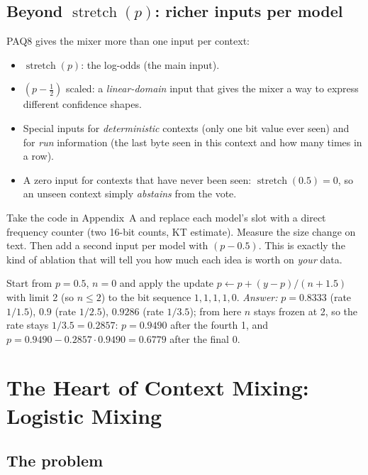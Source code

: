 \documentclass[11pt,a4paper,openany]{book}
\newcommand{\st}{\operatorname{stretch}}
\theoremstyle{definition}
\theoremstyle{remark}
\begin{document}
\section{Beyond $\st(p)$: richer inputs per model}

PAQ8 gives the mixer more than one input per context:
\begin{itemize}
\item $\st(p)$: the log-odds (the main input).
\item $(p-\tfrac12)$ scaled: a \emph{linear-domain} input that gives the mixer a way to express different confidence shapes.
\item Special inputs for \emph{deterministic} contexts (only one bit value ever seen) and for \emph{run} information (the last byte seen in this context and how many times in a row).
\item A zero input for contexts that have never been seen: $\st(0.5)=0$, so an unseen context simply \emph{abstains} from the vote.
\end{itemize}

\begin{handson}
Take the code in Appendix~A and replace each model's slot with a direct frequency counter (two 16-bit counts, KT estimate). Measure the size change on text. Then add a second input per model with $(p-0.5)$. This is exactly the kind of ablation that will tell you how much each idea is worth on \emph{your} data.
\end{handson}

\begin{exercise}
Start from $p=0.5$, $n=0$ and apply the update $p\leftarrow p+(y-p)/(n+1.5)$ with limit 2 (so $n\le2$) to the bit sequence $1,1,1,1,0$. \emph{Answer:} $p=0.8333$ (rate $1/1.5$), $0.9$ (rate $1/2.5$), $0.9286$ (rate $1/3.5$); from here $n$ stays frozen at 2, so the rate stays $1/3.5=0.2857$: $p=0.9490$ after the fourth 1, and $p=0.9490-0.2857\cdot0.9490=0.6779$ after the final 0.
\end{exercise}


\chapter{The Heart of Context Mixing: Logistic Mixing}

\section{The problem}
\end{document}
